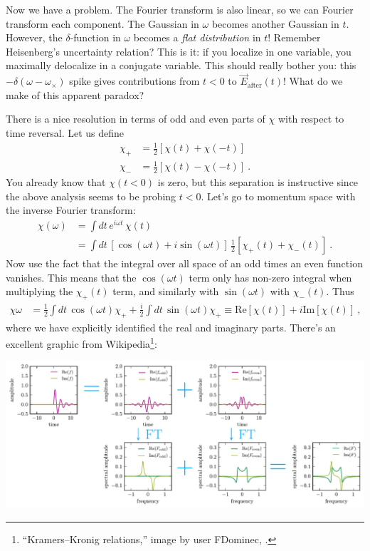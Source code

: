 Now we have a problem. The Fourier transform is also linear, so we can Fourier transform each component. The Gaussian in $\omega$ becomes another Gaussian in $t$. However, the $\delta$-function in $\omega$ becomes a \emph{flat distribution} in $t$! Remember Heisenberg's uncertainty relation? This is it: if you localize in one variable, you maximally delocalize in a conjugate variable. This should really bother you: this $-\delta(\omega-\omega_\times)$ spike gives contributions from $t<0$ to $\vec{E}_\text{after}(t)$! What do we make of this apparent paradox?


There is a nice resolution in terms of odd and even parts of $\chi$ with respect to time reversal. Let us define
\begin{align}
	\chi_+ &= \frac{1}{2}\left[\chi(t) + \chi(-t)\right]
	\\
	\chi_- &= \frac{1}{2}\left[\chi(t) - \chi(-t)\right] \ .
\end{align}
You already know that $\chi(t<0)$ is zero, but this separation is instructive since the above analysis seems to be probing $t<0$. Let's go to momentum space with the inverse Fourier transform:
\begin{align}
	\chi(\omega) &= \int dt\,  e^{i\omega t} \, \chi(t)
	\\
	&=
	\int dt\,  \left[\cos(\omega t)+i\sin(\omega t)\right] 
	\, \frac{1}{2}\left[\chi_+(t)+ \chi_-(t)\right] \ .
\end{align}
Now use the fact that the integral over all space of an odd times an even function vanishes. This means that the $\cos(\omega t)$ term only has non-zero integral when multiplying the $\chi_+(t)$ term, and similarly with $\sin(\omega t)$ with $\chi_-(t)$. Thus
\begin{align}
	\chi \omega &= 
	\frac{1}{2}\int dt\, 
	\cos(\omega t) \chi_+
	+
	\frac{i}{2}\int dt\, 
	\sin(\omega t) \chi_+
	\equiv
	\text{Re}[\chi(t)]
	+i
	\text{Im}[\chi(t)] \ ,
\end{align}
where we have explicitly identified the real and imaginary parts. There's an excellent graphic from Wikipedia\footnote{``Kramers--Kronig relations,'' image by user FDominec, .}:
\begin{center}
\includegraphics[width=.9\textwidth]{figures/Kramers_05_Fdominec.pdf}
\end{center}
